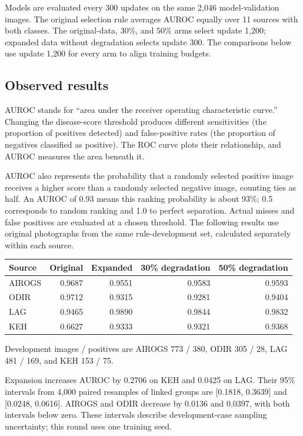 \documentclass[
  10pt,
]{article}
\newcounter{none} %
\begin{document}
Models are evaluated every 300 updates on the same 2,046
model-validation images. The original selection rule averages AUROC
equally over 11 sources with both classes. The original-data, 30\%, and
50\% arms select update 1,200; expanded data without degradation selects
update 300. The comparisons below use update 1,200 for every arm to
align training budgets.

\subsection{Observed results}\label{observed-results}

AUROC stands for ``area under the receiver operating characteristic
curve.'' Changing the disease-score threshold produces different
sensitivities (the proportion of positives detected) and false-positive
rates (the proportion of negatives classified as positive). The ROC
curve plots their relationship, and AUROC measures the area beneath it.

AUROC also represents the probability that a randomly selected positive
image receives a higher score than a randomly selected negative image,
counting ties as half. An AUROC of 0.93 means this ranking probability
is about 93\%; 0.5 corresponds to random ranking and 1.0 to perfect
separation. Actual misses and false positives are evaluated at a chosen
threshold. The following results use original photographs from the same
rule-development set, calculated separately within each source.

{\def\LTcaptype{none} %
\begin{longtable}[]{@{}lrrrr@{}}
\toprule\noalign{}
Source & Original & Expanded & 30\% degradation & 50\% degradation \\
\midrule\noalign{}
\endhead
\bottomrule\noalign{}
\endlastfoot
AIROGS & 0.9687 & 0.9551 & 0.9583 & 0.9593 \\
ODIR & 0.9712 & 0.9315 & 0.9281 & 0.9404 \\
LAG & 0.9465 & 0.9890 & 0.9844 & 0.9832 \\
KEH & 0.6627 & 0.9333 & 0.9321 & 0.9368 \\
\end{longtable}
}

Development images / positives are AIROGS 773 / 380, ODIR 305 / 28, LAG
481 / 169, and KEH 153 / 75.

Expansion increases AUROC by 0.2706 on KEH and 0.0425 on LAG. Their 95\%
intervals from 4,000 paired resamples of linked groups are {[}0.1818,
0.3639{]} and {[}0.0248, 0.0616{]}. AIROGS and ODIR decrease by 0.0136
and 0.0397, with both intervals below zero. These intervals describe
development-case sampling uncertainty; this round uses one training
seed.
\end{document}
